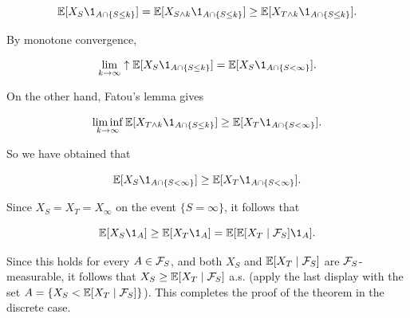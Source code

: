 \documentclass[../Main.tex]{subfiles}
\begin{document}
{    $$\EE[X_S \1_{A \cap \{S \leq k\}}] = \EE[X_{S \wedge k} \1_{A \cap \{S \leq k\}}] \geq \EE[X_{T \wedge k} \1_{A \cap \{S \leq k\}}].$$

    By monotone convergence,

    $$\lim_{k \to \infty} \uparrow \EE[X_S \1_{A \cap \{S \leq k\}}] = \EE[X_S \1_{A \cap \{S < \infty\}}].$$

    On the other hand, Fatou's lemma gives

    $$\liminf_{k \to \infty} \EE[X_{T \wedge k} \1_{A \cap \{S \leq k\}}] \geq \EE[X_T \1_{A \cap \{S < \infty\}}].$$

    So we have obtained that

    $$\EE[X_S \1_{A \cap \{S < \infty\}}] \geq \EE[X_T \1_{A \cap \{S < \infty\}}].$$

    Since $X_S = X_T = X_\infty$ on the event $\{S = \infty\}$, it follows that

    $$\EE[X_S \1_A] \geq \EE[X_T \1_A] = \EE[\EE[X_T \mid \F_S] \1_A].$$

    Since this holds for every $A \in \mathcal{F}_S$, and both $X_S$ and $\mathbb{E}[X_T \mid \mathcal{F}_S]$ are $\mathcal{F}_S$-measurable, it follows that $X_S \geq \mathbb{E}[X_T \mid \mathcal{F}_S]$ a.s. (apply the last display with the set $A = \{X_S < \mathbb{E}[X_T \mid \mathcal{F}_S]\}$). This completes the proof of the theorem in the discrete case.

}
\end{document}
